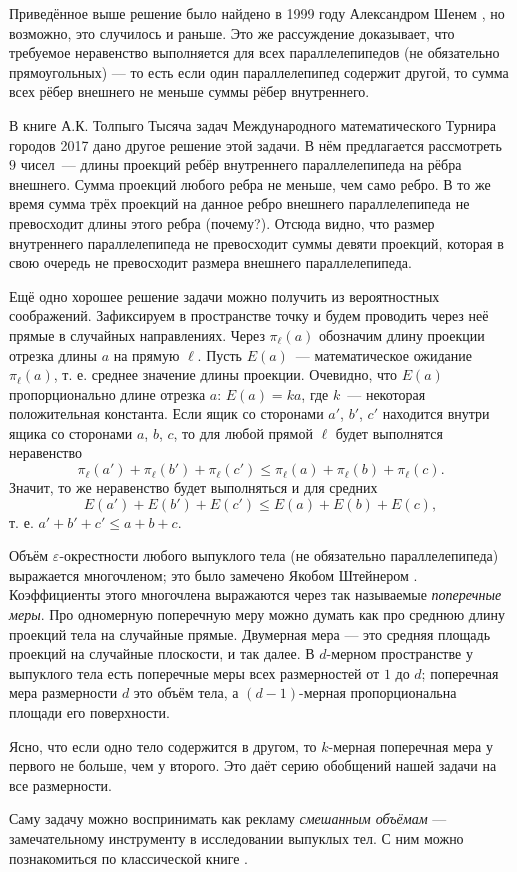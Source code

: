 \begin{addedbytheeditors}
Приведённое выше решение было найдено в 1999 году Александром Шенем \cite{shen}, но возможно, это случилось и раньше.
Это же рассуждение доказывает, что требуемое неравенство выполняется для всех параллелепипедов (не обязательно прямоугольных) --- то есть если один параллелепипед содержит другой, то сумма всех рёбер внешнего не меньше суммы рёбер внутреннего.

В книге А.К. Толпыго Тысяча задач Международного математического Турнира городов 2017 дано другое решение этой задачи. В нём предлагается рассмотреть $9$ чисел~--- длины проекций ребёр внутреннего параллелепипеда на рёбра внешнего. Сумма проекций любого ребра не меньше, чем само ребро. В то же время сумма трёх проекций на данное ребро внешнего параллелепипеда не превосходит длины этого ребра (почему?). Отсюда видно, что размер внутреннего параллелепипеда не превосходит суммы девяти проекций, которая в свою очередь не превосходит размера внешнего параллелепипеда.

Ещё одно хорошее решение задачи можно получить из вероятностных соображений. Зафиксируем в пространстве точку и будем проводить через неё прямые в случайных направлениях. Через $\pi_\ell(a)$ обозначим длину проекции отрезка длины $a$ на прямую $\ell$. Пусть $E(a)$~--- математическое ожидание $\pi_\ell(a)$, т. е. среднее значение длины проекции. Очевидно, что $E(a)$ пропорционально длине отрезка $a$: $E(a)=ka$, где $k$~--- некоторая положительная константа. Если ящик со сторонами $a'$,  $b'$, $c'$ находится внутри ящика со сторонами $a$, $b$, $c$, то для любой прямой $\ell$ будет выполнятся неравенство
$$\pi_\ell(a')+\pi_\ell(b')+\pi_\ell(c')\le \pi_\ell(a)+\pi_\ell(b)+\pi_\ell(c).$$ Значит, то же неравенство будет выполняться и для средних
$$E(a')+E(b')+E(c')\le E(a)+E(b)+E(c),$$
т. е. $a'+b'+c'\le a+b+c.$



Объём $\varepsilon$-окрестности любого выпуклого тела (не обязательно параллелепипеда) выражается многочленом; это было замечено Якобом Штейнером \cite{steiner}.
Коэффициенты этого многочлена выражаются через так называемые \emph{поперечные меры}.
Про одномерную поперечную меру можно думать как про среднюю длину проекций тела на случайные прямые.
Двумерная мера --- это средняя площадь проекций на случайные плоскости, и так далее.
В $d$-мерном пространстве у выпуклого тела есть поперечные меры всех размерностей от $1$ до $d$;
поперечная мера размерности $d$ это объём тела, а $(d-1)$-мерная пропорциональна площади его поверхности.

Ясно, что если одно тело содержится в другом, то $k$-мерная поперечная мера у первого не больше, чем у второго.
Это даёт серию обобщений нашей задачи на все размерности.

Саму задачу можно воспринимать как рекламу \emph{смешанным объёмам} --- замечательному инструменту в исследовании выпуклых тел.
С ним можно познакомиться по классической книге \cite{burago-zalgaller}.\pr
\end{addedbytheeditors}




